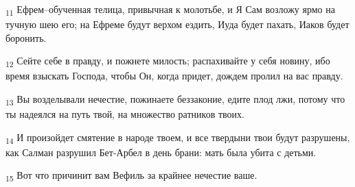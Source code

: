 \begin{tcolorbox}
\textsubscript{11} Ефрем--обученная телица, привычная к молотьбе, и Я Сам возложу ярмо на тучную шею его; на Ефреме будут верхом ездить, Иуда будет пахать, Иаков будет боронить.
\end{tcolorbox}
\begin{tcolorbox}
\textsubscript{12} Сейте себе в правду, и пожнете милость; распахивайте у себя новину, ибо время взыскать Господа, чтобы Он, когда придет, дождем пролил на вас правду.
\end{tcolorbox}
\begin{tcolorbox}
\textsubscript{13} Вы возделывали нечестие, пожинаете беззаконие, едите плод лжи, потому что ты надеялся на путь твой, на множество ратников твоих.
\end{tcolorbox}
\begin{tcolorbox}
\textsubscript{14} И произойдет смятение в народе твоем, и все твердыни твои будут разрушены, как Салман разрушил Бет-Арбел в день брани: мать была убита с детьми.
\end{tcolorbox}
\begin{tcolorbox}
\textsubscript{15} Вот что причинит вам Вефиль за крайнее нечестие ваше.
\end{tcolorbox}
